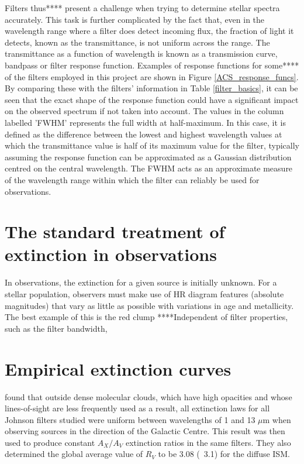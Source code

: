 \documentclass[12pt, a4paper]{report}
\begin{document}
Filters thus**** present a challenge when trying to determine stellar spectra accurately. This task is further complicated by the fact that, even in the wavelength range where a filter does detect incoming flux, the fraction of light it detects, known as the transmittance, is not uniform across the range. The transmittance as a function of wavelength is known as a transmission curve, bandpass or filter response function. Examples of response functions for some**** of the filters employed in this project are shown in Figure \ref{ACS_response_funcs}. By comparing these with the filters' information in Table \ref{filter_basics}, it can be seen that the exact shape of the response function could have a significant impact on the observed spectrum if not taken into account.
The values in the column labelled 'FWHM' represents the full width at half-maximum. In this case, it is defined as the difference between the lowest and highest wavelength values at which the transmittance value is half of its maximum value for the filter, typically assuming the response function can be approximated as a Gaussian distribution centred on the central wavelength. The FWHM acts as an approximate measure of the wavelength range within which the filter can reliably be used for observations.

\section{The standard treatment of extinction in observations}
In observations, the extinction for a given source is initially unknown. For a stellar population, observers must make use of HR diagram features (absolute magnitudes) that vary as little as possible with variations in age and metallicity. The best example of this is the red clump \citep{1992ApJS...78..517C} ****Independent of filter properties, such as the filter bandwidth,


\section{Empirical extinction curves}
\cite{1985ApJ...288..618R} found that outside dense molecular clouds, which have high opacities and whose lines-of-sight are less frequently used as a result, all extinction laws for all Johnson filters studied were uniform between wavelengths of 1 and 13 $\mu$m when observing sources in the direction of the Galactic Centre. This result was then used to produce constant $A_{X}/A_{V}$ extinction ratios in the same filters. They also determined the global average value of $R_{V}$ to be 3.08 (~3.1) for the diffuse ISM.
\end{document}
